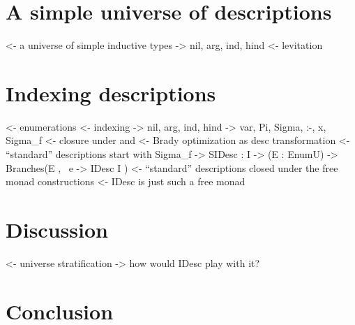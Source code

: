 \documentclass[preprint, authoryear, onecolumn]{sigplanconf}
\newenvironment{structure}{\footnotesize\verbatim}{\endverbatim}
\begin{document}
\section{A simple universe of descriptions}

\begin{structure}
<- a universe of simple inductive types
    -> nil, arg, ind, hind
<- levitation
\end{structure}


\section{Indexing descriptions}


\begin{structure}
<- enumerations
<- indexing
    -> nil, arg, ind, hind
    -> var, Pi, Sigma, :-, x, Sigma_f
<- closure under \box and \diamond
<- Brady optimization as desc transformation
<- ``standard'' descriptions start with Sigma_f
    -> SIDesc : I -> (E : EnumU) -> Branches(E , \ e -> IDesc I )
<- ``standard'' descriptions closed under the free monad constructions
<- IDesc is just such a free monad
\end{structure}


\section{Discussion}

\begin{structure}
<- universe stratification
    -> how would IDesc play with it?
\end{structure}



\section{Conclusion}

\begin{structure}
\end{structure}
\end{document}
